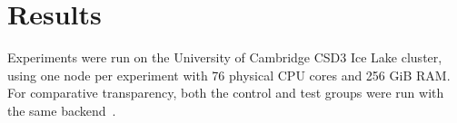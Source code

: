 \documentclass[11pt,twocolumn]{article}
\newcommand{\citen}[1]{~\parencite{#1}}
\begin{document}

\section{Results}

\newcommand{\MS}{{\color{BrickRed}\bfseries max-steps}}
\newcommand{\TO}{{\color{OrangeRed}\bfseries timeout}}
\newcommand{\best}{\color{Green}}


\setlength{\defaultaddspace}{4pt}

Experiments were run on the University of Cambridge CSD3 Ice Lake cluster, using one node per experiment with 76 physical CPU cores and 256 GiB RAM.
For comparative transparency, both the control and test groups were run with the same backend\citen{connections_2023}.
\end{document}
